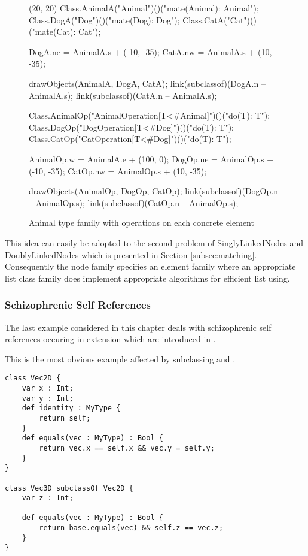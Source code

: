 \begin{figure}[H]
	\centering
	\begin{emp}[classdiag](20, 20)
		Class.AnimalA("Animal")()("mate(Animal): Animal");
		Class.DogA("Dog")()("mate(Dog): Dog");
		Class.CatA("Cat")()("mate(Cat): Cat");

		DogA.ne = AnimalA.s + (-10, -35);
		CatA.nw = AnimalA.s + (10, -35);

		drawObjects(AnimalA, DogA, CatA);
		link(subclassof)(DogA.n -- AnimalA.s);
		link(subclassof)(CatA.n -- AnimalA.s);

		Class.AnimalOp("AnimalOperation[T<#Animal]")()("do(T): T");
		Class.DogOp("DogOperation[T<#Dog]")()("do(T): T");
		Class.CatOp("CatOperation[T<#Dog]")()("do(T): T");

		AnimalOp.w = AnimalA.e + (100, 0);
		DogOp.ne = AnimalOp.s + (-10, -35);
		CatOp.nw = AnimalOp.s + (10, -35);

		drawObjects(AnimalOp, DogOp, CatOp);
		link(subclassof)(DogOp.n -- AnimalOp.s);
		link(subclassof)(CatOp.n -- AnimalOp.s);
	\end{emp}
	\caption{Animal type family with operations on each concrete element}
	\label{fig:operationFamily}
\end{figure}

This idea can easily be adopted to the second problem of SinglyLinkedNodes
and DoublyLinkedNodes which is presented in Section
\ref{subsec:matching}. Consequently the node family specifies an element
family where an appropriate list class family does implement appropriate
algorithms for efficient list using.

\subsubsection{Schizophrenic Self References}
The last example considered in this chapter deals with schizophrenic self
references occuring in extension which are introduced in .

This is the most obvious example affected by subclassing and \mytype.

\begin{lstlisting}[float=ht,language=ooplss,caption=Avoid schizophrenic self references with \mytype.,label=lst:solveSchizo]
class Vec2D {
	var x : Int;
	var y : Int;
	def identity : MyType {
		return self;
	}
	def equals(vec : MyType) : Bool {
		return vec.x == self.x && vec.y = self.y;
	}
}

class Vec3D subclassOf Vec2D {
	var z : Int;

	def equals(vec : MyType) : Bool {
		return base.equals(vec) && self.z == vec.z;
	}
}
\end{lstlisting}

